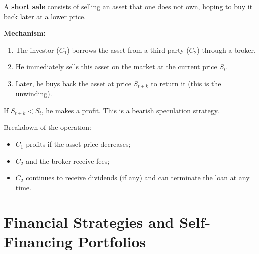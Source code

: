 \begin{tcolorbox}[title=Reminder: Short Selling, colback=blue!5!white, colframe=blue!40!black]
A \textbf{short sale} consists of selling an asset that one does not own, hoping to buy it back later at a lower price.

\medskip
\textbf{Mechanism:}
\begin{enumerate}
    \item The investor ($C_1$) borrows the asset from a third party ($C_2$) through a broker.
    \item He immediately sells this asset on the market at the current price $S_t$.
    \item Later, he buys back the asset at price $S_{t+k}$ to return it (this is the unwinding).
\end{enumerate}

If $S_{t+k} < S_t$, he makes a profit. This is a bearish speculation strategy.

\begin{center}
\end{center}
\end{tcolorbox}
Breakdown of the operation:
\begin{itemize}
  \item $C_1$ profits if the asset price decreases;
  \item $C_2$ and the broker receive fees;
  \item $C_2$ continues to receive dividends (if any) and can terminate the loan at any time.
\end{itemize}


\section{Financial Strategies and Self-Financing Portfolios}

